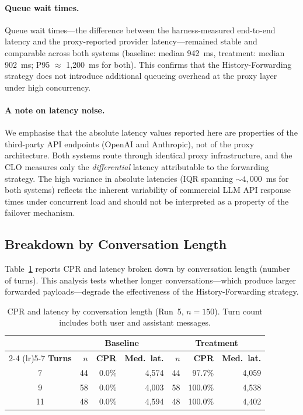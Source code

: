 \paragraph{Queue wait times.}
Queue wait times---the difference between the harness-measured end-to-end latency and the proxy-reported provider latency---remained stable and comparable across both systems (baseline: median 942~ms, treatment: median 902~ms; P95 $\approx$ 1{,}200~ms for both). This confirms that the History-Forwarding strategy does not introduce additional queueing overhead at the proxy layer under high concurrency.

\paragraph{A note on latency noise.}
We emphasise that the absolute latency values reported here are properties of the third-party API endpoints (OpenAI and Anthropic), not of the proxy architecture. Both systems route through identical proxy infrastructure, and the CLO measures only the \textit{differential} latency attributable to the forwarding strategy. The high variance in absolute latencies (IQR spanning ${\sim}4{,}000$~ms for both systems) reflects the inherent variability of commercial LLM API response times under concurrent load and should not be interpreted as a property of the failover mechanism.

\subsection{Breakdown by Conversation Length}

Table~\ref{tab:by_length} reports CPR and latency broken down by conversation length (number of turns). This analysis tests whether longer conversations---which produce larger forwarded payloads---degrade the effectiveness of the History-Forwarding strategy.

\begin{table}[t]
\centering
\caption{CPR and latency by conversation length (Run~5, $n = 150$). Turn count includes both user and assistant messages.}
\label{tab:by_length}
\small
\begin{tabular}{crrrrrr}
\toprule
 & \multicolumn{3}{c}{\textbf{Baseline}} & \multicolumn{3}{c}{\textbf{Treatment}} \\
\cmidrule(lr){2-4} \cmidrule(lr){5-7}
\textbf{Turns} & $n$ & \textbf{CPR} & \textbf{Med.\ lat.} & $n$ & \textbf{CPR} & \textbf{Med.\ lat.} \\
\midrule
7   & 44 & 0.0\% & 4{,}574 & 44 & 97.7\% & 4{,}059 \\
9   & 58 & 0.0\% & 4{,}003 & 58 & 100.0\% & 4{,}538 \\
11  & 48 & 0.0\% & 4{,}594 & 48 & 100.0\% & 4{,}402 \\
\bottomrule
\end{tabular}
\end{table}

